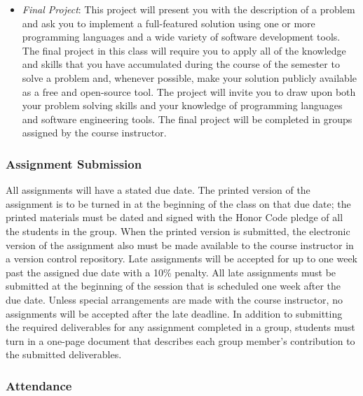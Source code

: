 \begin{itemize}

    \item {\em Final Project}: This project will present you with the description of a problem and ask you to
      implement a full-featured solution using one or more programming languages and a wide variety of software
      development tools.  The final project in this class will require you to apply all of the knowledge and skills
      that you have accumulated during the course of the semester to solve a problem and, whenever possible,
      make your solution publicly available as a free and open-source tool.  The project will invite you to draw upon
      both your problem solving skills and your knowledge of programming languages and software engineering tools. The
      final project will be completed in groups assigned by the course instructor.

  \end{itemize}

  \subsubsection*{Assignment Submission}

  All assignments will have a stated due date. The printed version of the assignment is to be turned in at the beginning
  of the class on that due date; the printed materials must be dated and signed with the Honor Code pledge of all the
  students in the group.  When the printed version is submitted, the electronic version of the assignment also must be
  made available to the course instructor in a version control repository. Late assignments will be accepted for up to one
  week past the assigned due date with a 10\% penalty. All late assignments must be submitted at the beginning of the
  session that is scheduled one week after the due date. Unless special arrangements are made with the course instructor,
  no assignments will be accepted after the late deadline. In addition to submitting the required deliverables for any
  assignment completed in a group, students must turn in a one-page document that describes each group member's
  contribution to the submitted deliverables.  

  \subsubsection*{Attendance}

